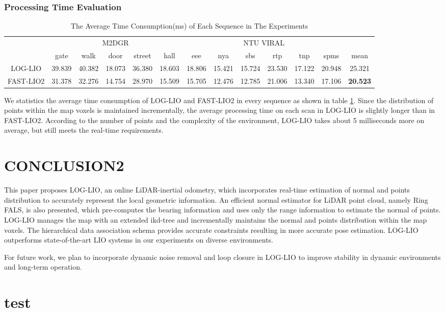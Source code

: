 \documentclass[letterpaper, 10 pt, conference]{ieeeconf}  %
\begin{document}
\subsubsection{Processing Time Evaluation}
\begin{table}[htb!]
        \caption{The Average Time Consumption(ms) of Each Sequence in The Experiments}
        \centering
        \begin{tabular}{c|c|c|c|c|c|c|c|c|c|c|c|c}
                \toprule
                {}        & \multicolumn{5}{c|}{M2DGR} & \multicolumn{6}{c|}{NTU VIRAL} &                                                                                                  \\
                {}        & gate                       & walk                           & door   & street & hall   & eee    & nya    & sbs    & rtp    & tnp    & spms   & mean            \\
                \midrule
                LOG-LIO   & 39.839                     & 40.382                         & 18.073 & 36.380 & 18.603 & 18.806 & 15.421 & 15.724 & 23.530 & 17.122 & 20.948 & 25.321          \\
                FAST-LIO2 & 31.378                     & 32.276                         & 14.754 & 28.970 & 15.509 & 15.705 & 12.476 & 12.785 & 21.006 & 13.340 & 17.106 & \textbf{20.523} \\
                \bottomrule
        \end{tabular}
        \label{tab_lio_time}
\end{table}
We statistics the average time consumption of LOG-LIO and FAST-LIO2 in every sequence as shown in table \ref{tab_lio_time}.
Since the distribution of points within the map voxels is maintained incrementally, the average processing time on each scan in LOG-LIO is slightly longer than in FAST-LIO2.
According to the number of points and the complexity of the environment, LOG-LIO takes about 5 milliseconds more on average, but still meets the real-time requirements.

\section{CONCLUSION2}
\label{sec:conclusion_and_future_work}
This paper proposes LOG-LIO, an online LiDAR-inertial odometry, which incorporates real-time estimation of normal and points distribution to accurately represent the local geometric information.
An efficient normal estimator for LiDAR point cloud, namely Ring FALS, is also presented, which pre-computes the bearing information and uses only the range information to estimate the normal of points. 
LOG-LIO manages the map with an extended ikd-tree and incrementally maintains the normal and points distribution within the map voxels. 
The hierarchical data association schema provides accurate constraints resulting in more accurate pose estimation. 
LOG-LIO outperforms state-of-the-art LIO systems in our experiments on diverse environments. 

For future work, we plan to incorporate dynamic noise removal and loop closure in LOG-LIO to improve stability in dynamic environments and long-term operation.

\section{test}


\end{document}
